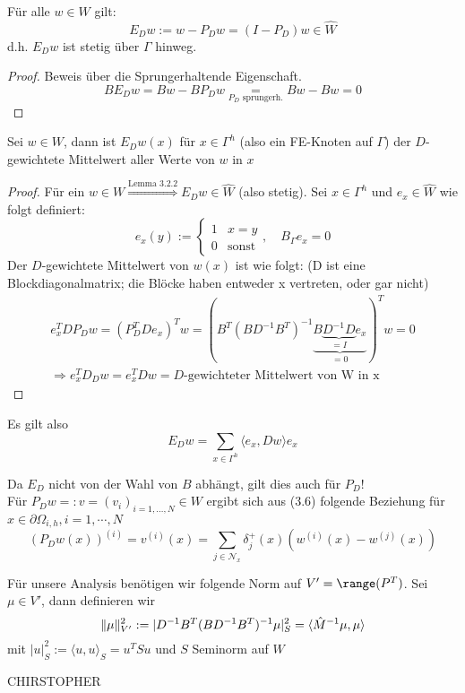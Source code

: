 \begin{lemma}%
  Für alle $w\in W$ gilt: 
  \[
    E_{D}w := w-P_Dw = (I-P_D)w \in \hat{W}
  \]
  d.h. $E_D w$ ist stetig über $\Gamma$ hinweg.
\end{lemma}

\begin{proof}
 Beweis über die Sprungerhaltende Eigenschaft. 
 \[
   BE_Dw=Bw-BP_Dw \underset{P_D\text{ sprungerh.}}{=} Bw-Bw =0
 \]
\end{proof}

\begin{lemma} %
  Sei $w\in W$, dann ist $E_Dw(x)$ für $x\in\Gamma^h$ (also ein FE-Knoten auf $\Gamma$) der $D$-gewichtete Mittelwert aller Werte von $w$ in $x$
\end{lemma}

\begin{proof}
  Für ein $w\in W \overset{\text{Lemma 3.2.2}}{\Longrightarrow} E_Dw\in \hat{W}$ (also stetig). Sei $x\in\Gamma^h$ und $e_x\in\hat{W}$ wie folgt definiert:
  \[
    e_x(y) := 
    \begin{cases}
      1& x=y\\
      0& \text{sonst}
    \end{cases},
    \quad B_\Gamma e_x =0
  \]
  Der $D$-gewichtete Mittelwert von $w(x)$ ist wie folgt: (D ist eine Blockdiagonalmatrix; die Blöcke haben entweder x vertreten, oder gar nicht)
  \begin{align*}
    e_x^TDP_Dw = (P_D^TDe_x)^Tw =(B^T(BD^{-1}B^T)^{-1} \underbrace{B\underbrace{D^{-1}D}_{=I}e_x}_{=0})^Tw=0\\
    \Rightarrow e_x^TD_Dw = e_x^TDw=D\text{-gewichteter Mittelwert von W in x}
  \end{align*}
\end{proof}

Es gilt also 
\begin{equation}%
  E_Dw = \sum_{x\in \Gamma^h} \langle e_x, Dw \rangle e_x
\end{equation}

Da $E_D$ nicht von der Wahl von $B$ abhängt, gilt dies auch für $P_D$!\\
Für $P_Dw=:v=(v_i)_{i=1,\ldots,N}\in W$ ergibt sich aus (3.6) folgende Beziehung für $x\in \partial\Omega_{i,h}, i=1,\cdots,N$
\[ %
  (P_Dw(x))^{(i)} = v^{(i)}(x) = \sum_{j\in \mathcal{N}_x} \delta_j^+(x) (w^{(i)}(x)-w^{(j)}(x))
\]

Für unsere Analysis benötigen wir folgende Norm auf $V'=\range(P^T)$. Sei $\mu\in V'$, dann definieren wir
\[%
  \norm{\mu}_{V'}^2 := |D^{-1}B^T(BD^{-1}B^T)^{-1}\mu|_S^2 = \langle\hat{M}^{-1}\mu,\mu \rangle
\]
mit $|u|_S^2:=\langle u,u \rangle_S = u^TSu$ und $S$ Seminorm auf $W$

CHIRSTOPHER
